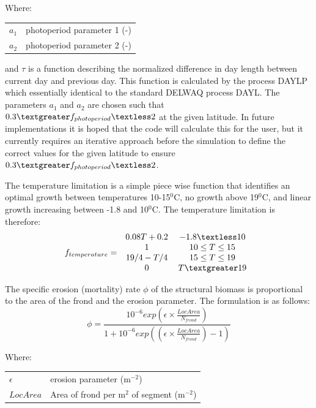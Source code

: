 \documentclass{deltares_manual}
\begin{document}
Where:\\

\begin{tabular}{ll}
	$a_1$    & photoperiod parameter 1 (-)\\
	$a_2$    & photoperiod parameter 2 (-)\\
\end{tabular}

and $\tau$ is a function describing the normalized difference in day length between current day and previous day. This function is calculated by the process DAYLP which essentially identical to the standard DELWAQ process DAYL. The parameters $a_1$ and $a_2$ are chosen such that $0.3 \textgreater f_{photoperiod} \textless 2$ at the given latitude. In future implementations it is hoped that the code will calculate this for the user, but it currently requires an iterative approach before the simulation to define the correct values for the given latitude to  ensure $0.3 \textgreater f_{photoperiod} \textless 2$.

The temperature limitation is a simple piece wise function that identifies an optimal growth between temperatures 10-15$^0$C, no growth above 19$^0$C, and linear growth increasing between -1.8 and 10$^0$C. The temperature limitation is therefore:
\begin{equation}
f_{temperature} =  
\left 
.\begin{tabular}{cc}
$ 0.08T + 0.2 $    & $-1.8 \textless 10$ \\
$  1 $             & $10 \leq T \leq 15$ \\
$19/4 - T/4$       & $15 \leq T \leq 19$ \\ 
$0$                & $T \textgreater 19$ \\
\end{tabular}
\right
.\end{equation}

The specific erosion (mortality) rate $\phi$ of the structural biomass is proportional to the area of the frond and the erosion parameter. The formulation is as follows:
\begin{equation}
\phi = \frac{10^{-6}exp(\epsilon\times \frac{LocArea}{N_{frond}})}{1+10^{-6}exp((\epsilon\times \frac{LocArea}{N_{frond}})-1)}
\end{equation}

Where:\\
\begin{tabular}{ll}
$\epsilon$ & erosion parameter (m$^{-2}$)\\
$LocArea$ & Area of frond per m$^{2}$ of segment (m$^{-2}$)
\end{tabular}
\end{document}
